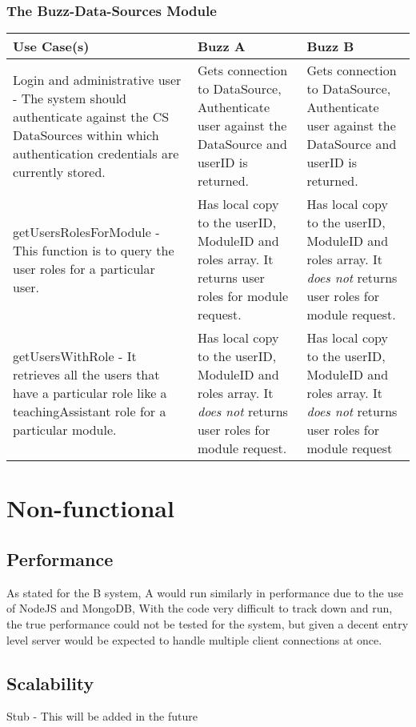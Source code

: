 \documentclass[12pt]{article}
\begin{document}
\subsubsection{The Buzz-Data-Sources Module}%
\begin{tabular}{|p{4.5cm}|p{4.5cm}|p{4.5cm}|}

\hline
Use Case(s) & Buzz A & Buzz B \\ 
\hline
Login and administrative user - The system should authenticate against the CS DataSources within which authentication credentials are currently stored. & Gets connection to DataSource, Authenticate user against the DataSource and userID is returned. & Gets connection to DataSource, Authenticate user against the DataSource and userID is returned.\\ %
\hline
getUsersRolesForModule - This function is to query the user roles for a particular user. & Has local copy to the userID, ModuleID and roles array. It returns user roles for module request. & Has local copy to the userID, ModuleID and roles array. It \emph{does not} returns user roles for module request.\\ %
\hline
getUsersWithRole - It retrieves all the users that have a particular role like a teachingAssistant role for a particular module. & Has local copy to the userID, ModuleID and roles array. It \emph{does not} returns user roles for module request. & Has local copy to the userID, ModuleID and roles array. It \emph{does not} returns user roles for module request\\ %
\hline

\end{tabular}


\section{Non-functional} %
\subsection{Performance}
As stated for the B system, A would run similarly in performance due to the use of NodeJS and MongoDB, With the code very difficult to track down and run, the true performance could not be tested for the system, but given a decent entry level server would be expected to handle multiple client connections at once.
\subsection{Scalability}
Stub - This will be added in the future
\end{document}
